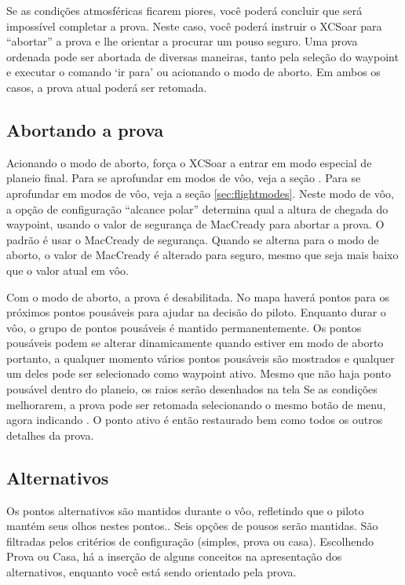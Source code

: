 Se as condições atmosféricas ficarem piores, você poderá concluir que será impossível completar a prova.  Neste caso, você poderá instruir o XCSoar para “abortar” a prova e lhe orientar a procurar um pouso seguro.  Uma prova ordenada pode ser abortada de diversas maneiras, tanto pela seleção do waypoint e executar o comando ‘ir para’ ou acionando o modo de aborto.  Em ambos os casos, a prova atual poderá ser retomada.

\subsection*{Abortando a prova}\label{sec:taskabort}
Acionando o modo de aborto, força o XCSoar a entrar em modo especial de planeio final.  Para se aprofundar em modos de vôo, veja a seção .  Para se aprofundar em modos de vôo, veja a seção  \ref{sec:flightmodes}. Neste modo de vôo, a opção de configuração “alcance polar” determina qual a altura de chegada do waypoint, usando o valor de segurança de MacCready para abortar a prova.  O padrão é usar o MacCready de segurança.  Quando se alterna para o modo de aborto, o valor de MacCready é alterado para seguro, mesmo que seja mais baixo que o valor atual em vôo.

Com o modo de aborto, a prova é desabilitada.  No mapa haverá pontos para os próximos pontos pousáveis para ajudar na decisão do piloto.  Enquanto durar o vôo, o grupo de pontos pousáveis é mantido permanentemente.  Os pontos pousáveis podem se alterar dinamicamente quando estiver em modo de aborto portanto, a qualquer momento vários pontos pousáveis são mostrados e qualquer um deles pode ser selecionado como waypoint ativo.  Mesmo que não haja ponto pousável dentro do planeio, os raios serão desenhados na tela
Se as condições melhorarem, a prova pode ser retomada selecionando o mesmo botão de menu, agora indicando . O ponto ativo é então restaurado bem como todos os outros detalhes da prova.

\subsection*{Alternativos} \label{sec:alternates}
Os pontos alternativos são mantidos durante o vôo, refletindo que o piloto mantém seus olhos nestes pontos..  Seis opções de pousos serão mantidas.  São filtradas pelos critérios de configuração (simples, prova ou casa).  
Escolhendo Prova ou Casa, há a inserção de alguns conceitos na apresentação dos alternativos, enquanto você está sendo orientado pela prova. 

